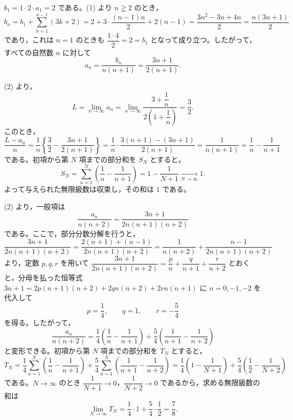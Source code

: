 
$b_{1}=1\cdot 2\cdot a_{1}=2$ である。(1) より $n\geqq 2$ のとき，
\[
  b_{n} = b_{1} + \sum_{k=1}^{n-1}(3k+2)
  = 2 + 3\cdot\frac{(n-1)n}{2} + 2(n-1)
  = \frac{3n^{2}-3n+4n}{2} = \frac{n(3n+1)}{2}
\]
であり，これは $n=1$ のときも $\dfrac{1\cdot 4}{2}=2=b_{1}$ となって成り立つ。したがって，すべての自然数 $n$ に対して
\[
  a_{n} = \frac{b_{n}}{n(n+1)} = \frac{3n+1}{2(n+1)}.
\]


(2) より，
\[
  L = \lim_{n\to\infty}a_{n} = \lim_{n\to\infty}\frac{3+\dfrac{1}{n}}{2\left(1+\dfrac{1}{n}\right)} = \frac{3}{2}.
\]
このとき，
\[
  \frac{L-a_{n}}{n}
  = \frac{1}{n}\left\{\frac{3}{2}-\frac{3n+1}{2(n+1)}\right\}
  = \frac{1}{n}\cdot\frac{3(n+1)-(3n+1)}{2(n+1)}
  = \frac{1}{n(n+1)} = \frac{1}{n} - \frac{1}{n+1}
\]
である。初項から第 $N$ 項までの部分和を $S_{N}$ とすると，
\[
  S_{N} = \sum_{n=1}^{N}\left(\frac{1}{n}-\frac{1}{n+1}\right) = 1 - \frac{1}{N+1}
  \xrightarrow[N\to\infty]{} 1.
\]
よって与えられた無限級数は収束し，その和は $1$ である。


(2) より，一般項は
\[
  \frac{a_{n}}{n(n+2)} = \frac{3n+1}{2n(n+1)(n+2)}
\]
である。ここで，部分分数分解を行うと，
\[
  \frac{3n+1}{2n(n+1)(n+2)}
  = \frac{2(n+1)+(n-1)}{2n(n+1)(n+2)}
  = \frac{1}{n(n+2)} + \frac{n-1}{2n(n+1)(n+2)}
\]
より，定数 $p, q, r$ を用いて $\dfrac{3n+1}{2n(n+1)(n+2)}=\dfrac{p}{n}+\dfrac{q}{n+1}+\dfrac{r}{n+2}$ とおくと，分母を払った恒等式 $3n+1=2p(n+1)(n+2)+2qn(n+2)+2rn(n+1)$ に $n=0, -1, -2$ を代入して
\[
  p = \frac{1}{4},\qquad q = 1,\qquad r = -\frac{5}{4}
\]
を得る。したがって，
\[
  \frac{a_{n}}{n(n+2)}
  = \frac{1}{4}\left(\frac{1}{n}-\frac{1}{n+1}\right) + \frac{5}{4}\left(\frac{1}{n+1}-\frac{1}{n+2}\right)
\]
と変形できる。初項から第 $N$ 項までの部分和を $T_{N}$ とすると，
\[
  T_{N}
  = \frac{1}{4}\sum_{n=1}^{N}\left(\frac{1}{n}-\frac{1}{n+1}\right) + \frac{5}{4}\sum_{n=1}^{N}\left(\frac{1}{n+1}-\frac{1}{n+2}\right)
  = \frac{1}{4}\left(1-\frac{1}{N+1}\right) + \frac{5}{4}\left(\frac{1}{2}-\frac{1}{N+2}\right)
\]
である。$N\to\infty$ のとき $\dfrac{1}{N+1}\to 0$，$\dfrac{1}{N+2}\to 0$ であるから，求める無限級数の和は
\[
  \lim_{N\to\infty}T_{N} = \frac{1}{4}\cdot 1 + \frac{5}{4}\cdot\frac{1}{2} = \frac{7}{8}.
\]


